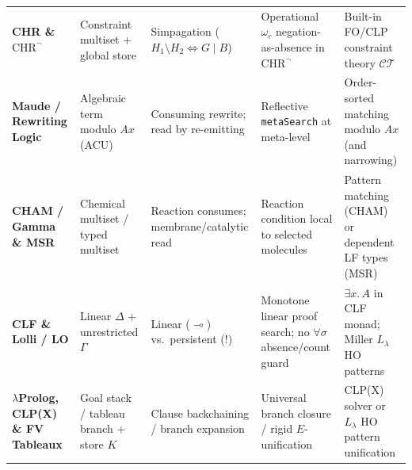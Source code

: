 \documentclass[11pt,a4paper]{article}
\theoremstyle{definition}
\begin{document}
\begin{table}[t]
\begin{tabular}{@{}>{\raggedright\arraybackslash}p{2.6cm}>{\raggedright\arraybackslash}p{2.3cm}>{\raggedright\arraybackslash}p{2.6cm}>{\raggedright\arraybackslash}p{3.6cm}>{\raggedright\arraybackslash}p{3.6cm}@{}}
\textbf{CHR \& $\text{CHR}^\neg$} \newline \cite{Fruhwirth2009CHR,VanWeert2006CHRneg} & Constraint multiset + global store & Simpagation ($H_1 \setminus H_2 \Longleftrightarrow G \mid B$) & Operational $\omega_r$ negation-as-absence in $\text{CHR}^\neg$ & Built-in FO/CLP constraint theory $\mathcal{CT}$ \\
\textbf{Maude / Rewriting Logic} \newline \cite{Meseguer1992Conditional} & Algebraic term modulo $Ax$ (ACU) & Consuming rewrite; read by re-emitting & Reflective \texttt{metaSearch} at meta-level & Order-sorted matching modulo $Ax$ (and narrowing) \\
\textbf{CHAM / Gamma \& MSR} \newline \cite{BanatreLeMetayer1990Gamma,BerryBoudol1992CHAM,Cervesato2000MSR} & Chemical multiset / typed multiset & Reaction consumes; membrane/catalytic read & Reaction condition local to selected molecules & Pattern matching (CHAM) or dependent LF types (MSR) \\
\textbf{CLF \& Lolli / LO} \newline \cite{Cervesato2002CLF,HodasMiller1994Lolli,AndreoliPareschi1991LO} & Linear $\Delta$ + unrestricted $\Gamma$ & Linear ($\multimap$) vs.\ persistent ($!$) & Monotone linear proof search; no $\forall \sigma$ absence/count guard & $\exists x.\, A$ in CLF monad; Miller $L_\lambda$ HO patterns \\
\textbf{$\lambda$Prolog, CLP(X) \& FV Tableaux} \newline \cite{MillerNadathur2012LambdaProlog,JaffarMaher1994CLP,Fitting1996Tableaux} & Goal stack / tableau branch + store $K$ & Clause backchaining / branch expansion & Universal branch closure / rigid $E$-unification~\cite{Gallier1992Rigid} & CLP(X) solver or $L_\lambda$ HO pattern unification \\
\bottomrule
\end{tabular}
\end{table}
\end{document}
